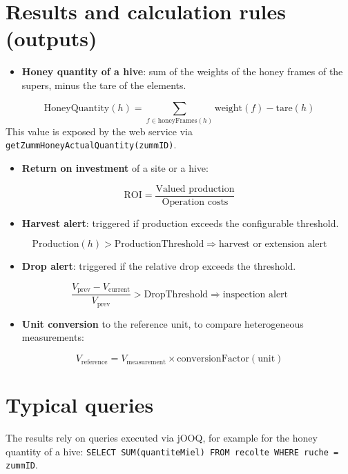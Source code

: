 \section{Results and calculation rules (outputs)}
\begin{itemize}
  \item \textbf{Honey quantity of a hive}: sum of the weights of the honey frames of the supers, minus the tare of the elements.
\end{itemize}
\[ \text{HoneyQuantity}(h) = \sum_{f \in \text{honeyFrames}(h)} \text{weight}(f) - \text{tare}(h) \]
This value is exposed by the web service via \texttt{getZummHoneyActualQuantity(zummID)}.
\begin{itemize}
  \item \textbf{Return on investment} of a site or a hive:
\end{itemize}
\[ \text{ROI} = \frac{\text{Valued production}}{\text{Operation costs}} \]
\begin{itemize}
  \item \textbf{Harvest alert}: triggered if production exceeds the configurable threshold.
\end{itemize}
\[ \text{Production}(h) > \text{ProductionThreshold} \Rightarrow \text{harvest or extension alert} \]
\begin{itemize}
  \item \textbf{Drop alert}: triggered if the relative drop exceeds the threshold.
\end{itemize}
\[ \frac{V_{\text{prev}} - V_{\text{current}}}{V_{\text{prev}}} > \text{DropThreshold} \Rightarrow \text{inspection alert} \]
\begin{itemize}
  \item \textbf{Unit conversion} to the reference unit, to compare heterogeneous measurements:
\end{itemize}
\[ V_{\text{reference}} = V_{\text{measurement}} \times \text{conversionFactor}(\text{unit}) \]

\section{Typical queries}
The results rely on queries executed via jOOQ, for example for the honey
quantity of a hive: \texttt{SELECT SUM(quantiteMiel) FROM recolte WHERE ruche = zummID}.
